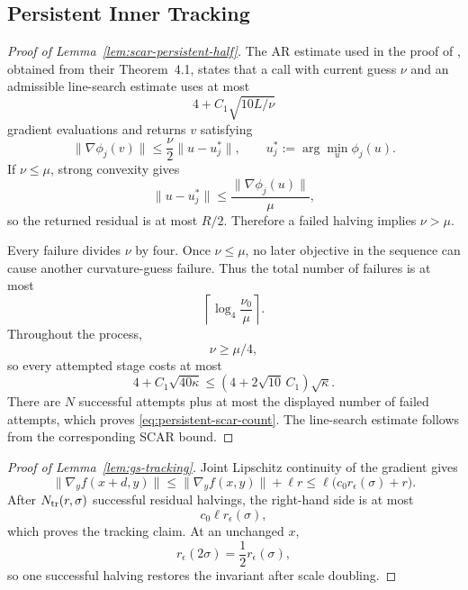 \subsection{Persistent Inner Tracking}
\label{app:persistent-scar-proofs}


\begin{proof}[Proof of Lemma~\ref{lem:scar-persistent-half}]
The AR estimate used in the proof of
\citet[Theorem~5.1]{lan2026optimal}, obtained from their
Theorem~4.1, states that a call with current guess $\nu$ and an
admissible line-search estimate uses at most
\[
    4+C_1\sqrt{10L/\nu}
\]
gradient evaluations and returns $v$ satisfying
\[
    \|\nabla\phi_j(v)\|
    \le
    \frac{\nu}{2}
    \|u-u_j^*\|,
    \qquad
    u_j^*
    :=
    \arg\min_u\phi_j(u).
\]
If $\nu\le\mu$, strong convexity gives
\[
    \|u-u_j^*\|
    \le
    \frac{\|\nabla\phi_j(u)\|}{\mu},
\]
so the returned residual is at most $R/2$.
Therefore a failed halving implies $\nu>\mu$.

Every failure divides $\nu$ by four.
Once $\nu\le\mu$, no later objective in the sequence can cause
another curvature-guess failure.
Thus the total number of failures is at most
\[
    \left\lceil
        \log_4\frac{\nu_0}{\mu}
    \right\rceil.
\]
Throughout the process,
\[
    \nu\ge\mu/4,
\]
so every attempted stage costs at most
\[
    4+C_1\sqrt{40\kappa}
    \le
    (4+2\sqrt{10}\,C_1)\sqrt\kappa.
\]
There are $N$ successful attempts plus at most the displayed number
of failed attempts, which proves
\eqref{eq:persistent-scar-count}.
The line-search estimate follows from the corresponding SCAR bound.
\end{proof}


\begin{proof}[Proof of Lemma~\ref{lem:gs-tracking}]
Joint Lipschitz continuity of the gradient gives
\[
    \|\nabla_yf(x+d,y)\|
    \le
    \|\nabla_yf(x,y)\|
    +
    \ell r
    \le
    \ell
    \bigl(
        c_0r_\epsilon(\sigma)+r
    \bigr).
\]
After
$N_{\rm tr}(r,\sigma)$ successful residual halvings, the right-hand
side is at most
\[
    c_0\ell r_\epsilon(\sigma),
\]
which proves the tracking claim.
At an unchanged $x$,
\[
    r_\epsilon(2\sigma)
    =
    \frac12r_\epsilon(\sigma),
\]
so one successful halving restores the invariant after scale
doubling.
\end{proof}


